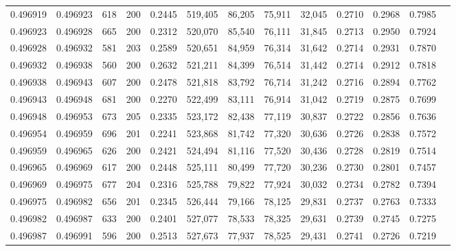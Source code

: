 \begin{tabular}{rrrrrrrrrrrrr}
0.496919 & 0.496923 &   618 & 200 &                                     0.2445 & 519,405 &  86,205 &  75,911 &  32,045 & 0.2710 & 0.2968 & 0.7985 \\
0.496923 & 0.496928 &   665 & 200 &                                     0.2312 & 520,070 &  85,540 &  76,111 &  31,845 & 0.2713 & 0.2950 & 0.7924 \\
0.496928 & 0.496932 &   581 & 203 &                                     0.2589 & 520,651 &  84,959 &  76,314 &  31,642 & 0.2714 & 0.2931 & 0.7870 \\
0.496932 & 0.496938 &   560 & 200 &                                     0.2632 & 521,211 &  84,399 &  76,514 &  31,442 & 0.2714 & 0.2912 & 0.7818 \\
0.496938 & 0.496943 &   607 & 200 &                                     0.2478 & 521,818 &  83,792 &  76,714 &  31,242 & 0.2716 & 0.2894 & 0.7762 \\
0.496943 & 0.496948 &   681 & 200 &                                     0.2270 & 522,499 &  83,111 &  76,914 &  31,042 & 0.2719 & 0.2875 & 0.7699 \\
0.496948 & 0.496953 &   673 & 205 &                                     0.2335 & 523,172 &  82,438 &  77,119 &  30,837 & 0.2722 & 0.2856 & 0.7636 \\
0.496954 & 0.496959 &   696 & 201 &                                     0.2241 & 523,868 &  81,742 &  77,320 &  30,636 & 0.2726 & 0.2838 & 0.7572 \\
0.496959 & 0.496965 &   626 & 200 &                                     0.2421 & 524,494 &  81,116 &  77,520 &  30,436 & 0.2728 & 0.2819 & 0.7514 \\
0.496965 & 0.496969 &   617 & 200 &                                     0.2448 & 525,111 &  80,499 &  77,720 &  30,236 & 0.2730 & 0.2801 & 0.7457 \\
0.496969 & 0.496975 &   677 & 204 &                                     0.2316 & 525,788 &  79,822 &  77,924 &  30,032 & 0.2734 & 0.2782 & 0.7394 \\
0.496975 & 0.496982 &   656 & 201 &                                     0.2345 & 526,444 &  79,166 &  78,125 &  29,831 & 0.2737 & 0.2763 & 0.7333 \\
0.496982 & 0.496987 &   633 & 200 &                                     0.2401 & 527,077 &  78,533 &  78,325 &  29,631 & 0.2739 & 0.2745 & 0.7275 \\
0.496987 & 0.496991 &   596 & 200 &                                     0.2513 & 527,673 &  77,937 &  78,525 &  29,431 & 0.2741 & 0.2726 & 0.7219 \\

\end{tabular}
